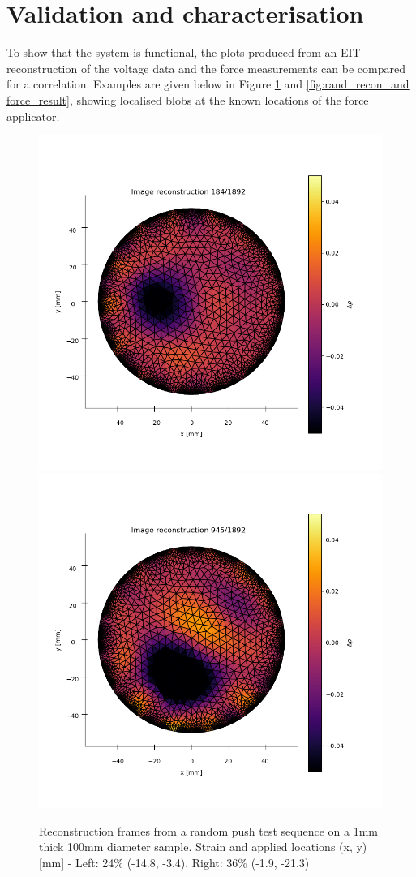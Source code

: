 \section{Validation and characterisation}
\label{sec:Validation and characterisation}
To show that the system is functional, the plots produced from an EIT reconstruction of the voltage data and the force measurements can be compared for a correlation. Examples are given below in Figure \ref{fig:rand_recon_result} and \ref{fig:rand_recon_and force_result}, showing localised blobs at the known locations of the force applicator.
\begin{figure}[H]
\centering
\includegraphics[width=0.45\linewidth]{Figures/DEA1_CBSR_8p_9push_rand10strain_30s_1mA_1_frame184.png}
\includegraphics[width=0.45\linewidth]{Figures/DEA1_CBSR_8p_9push_rand10strain_30s_1mA_1_frame945.png}
\caption{Reconstruction frames from a random push test sequence on a 1mm thick 100mm diameter sample. Strain and applied locations (x, y) [mm] - Left: 24\% (-14.8, -3.4). Right: 36\% (-1.9, -21.3)}
\label{fig:rand_recon_result}
\end{figure}
